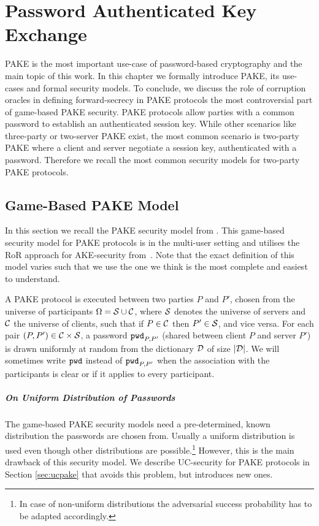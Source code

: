 \chapter{Password Authenticated Key Exchange}\label{ch:pake}
\acl{PAKE} is the most important use-case of password-based cryptography and the main topic of this work.
In this chapter we formally introduce \ac{PAKE}, its use-cases and formal security models.
To conclude, we discuss the role of corruption oracles in defining forward-secrecy in \ac{PAKE} protocols the most controversial part of game-based \ac{PAKE} security.
\ac{PAKE} protocols allow parties with a common password to establish an authenticated session key.
While other scenarios like three-party or two-server \ac{PAKE} exist, the most common scenario is two-party \ac{PAKE} where a client and server negotiate a session key, authenticated with a password.
Therefore we recall the most common security models for two-party \ac{PAKE} protocols.

\section{Game-Based PAKE Model} \label{sec:gamebasedpake} %
In this section we recall the \ac{PAKE} security model from \cite{Abdalla2005}.
This game-based security model for \ac{PAKE} protocols is in the multi-user setting and utilises the \acl{RoR} approach for \ac{AKE}-security from~\cite{Abdalla2005,Bellare2000}.
Note that the exact definition of this model varies such that we use the one we think is the most complete and easiest to understand.

A \ac{PAKE} protocol is executed between two parties $P$ and $P'$, chosen from the universe of participants $\Omega=\mathcal{S}\cup\mathcal{C}$, where $\mathcal{S}$ denotes the universe of servers and $\mathcal{C}$ the universe of clients, such that if $P\in\mathcal{C}$ then $P'\in\mathcal{S}$, and vice versa.
For each pair $(P,P')\in\mathcal{C}\times\mathcal{S}$, a password $\mathtt{pwd}_{P,P'}$ (shared between client $P$ and server $P'$) is drawn uniformly at random from the dictionary $\mathcal{D}$ of size $|\mathcal{D}|$.
We will sometimes write $\mathtt{pwd}$ instead of $\mathtt{pwd}_{P,P'}$ when the association with the participants is clear or if it applies to every participant.

\paragraph{On Uniform Distribution of Passwords}
The game-based \ac{PAKE} security models need a pre-determined, known distribution the passwords are chosen from.
Usually a uniform distribution is used even though other distributions are possible.\footnote{In case of non-uniform distributions the adversarial success probability has to be adapted accordingly.}
However, this is the main drawback of this security model.
We describe \ac{UC}-security for \ac{PAKE} protocols in Section \ref{sec:ucpake} that avoids this problem, but introduces new ones.


